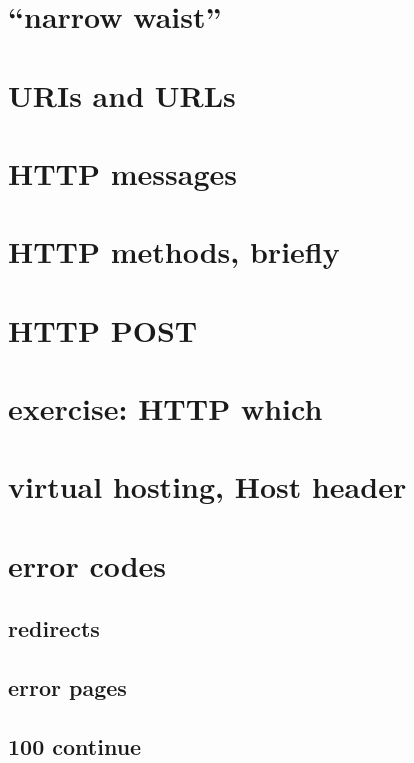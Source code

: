 \section{``narrow waist''}


\section{URIs and URLs}


\section{HTTP messages}


\section{HTTP methods, briefly}


\section{HTTP POST}


\section{exercise: HTTP which}


\section{virtual hosting, Host header}


\section{error codes}


\subsection{redirects}


\subsection{error pages}


\subsection{100 continue}


